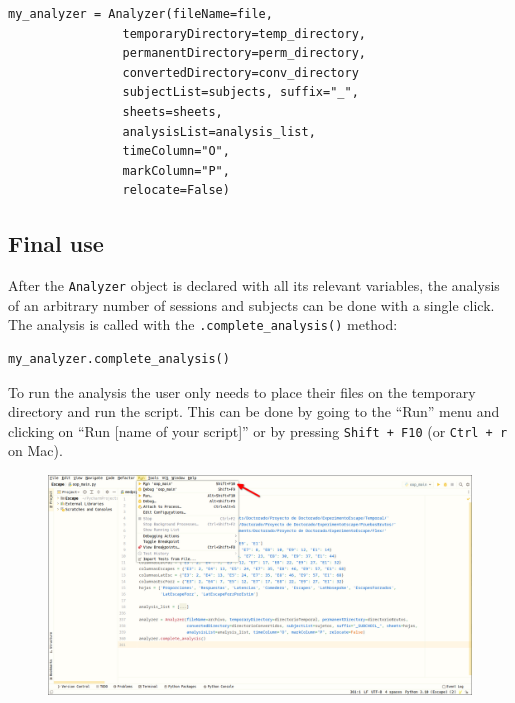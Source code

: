\documentclass[a4paper,12pt]{article}
\begin{document}
\begin{tcolorbox}[
    enhanced,
    attach boxed title to top left={xshift=6mm,yshift=-3mm},
    colback=lightgreen!20,
    colframe=lightgreen,
    colbacktitle=lightgreen,
    title=Python,
    fonttitle=\bfseries\color{black},
    boxed title style={size=small,colframe=lightgreen,sharp corners},
    sharp corners,
    ]
    \begin{verbatim}
my_analyzer = Analyzer(fileName=file,
                temporaryDirectory=temp_directory,
                permanentDirectory=perm_directory,
                convertedDirectory=conv_directory
                subjectList=subjects, suffix="_",
                sheets=sheets,
                analysisList=analysis_list,
                timeColumn="O",
                markColumn="P",
                relocate=False)
    \end{verbatim}
\end{tcolorbox}

\subsection{Final use}

After the \verb|Analyzer| object is declared with all its relevant variables, the analysis of an arbitrary number of sessions and subjects can be done with a single click.  The analysis is called with the \verb|.complete_analysis()| method:
\begin{tcolorbox}[
    enhanced,
    attach boxed title to top left={xshift=6mm,yshift=-3mm},
    colback=lightgreen!20,
    colframe=lightgreen,
    colbacktitle=lightgreen,
    title=Python,
    fonttitle=\bfseries\color{black},
    boxed title style={size=small,colframe=lightgreen,sharp corners},
    sharp corners,
    ]
    \begin{verbatim}
my_analyzer.complete_analysis()
    \end{verbatim}
\end{tcolorbox}

To run the analysis the user only needs to place their files on the temporary directory and run the script. This can be done by going to the ``Run'' menu and clicking on ``Run [name of your script]'' or by pressing \verb|Shift + F10| (or \verb|Ctrl + r| on Mac).

\begin{figure}[!ht]
    \begin{center}
        \includegraphics[scale=0.35]{pycharm-run.png}
    \end{center}
\end{figure}
\end{document}
